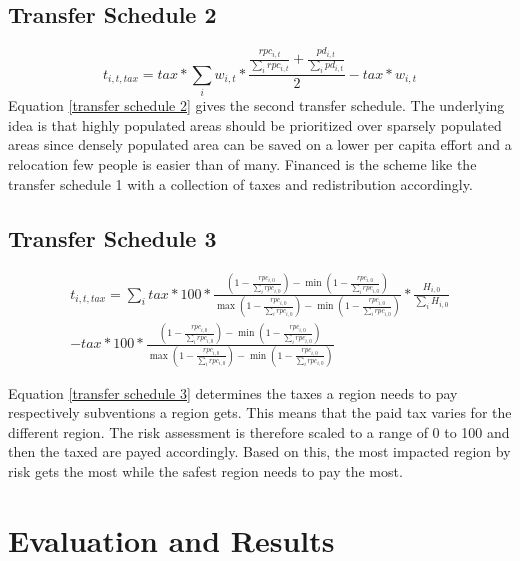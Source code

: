 \documentclass[10pt,a4paper]{article}
\begin{document}
\subsection{Transfer Schedule 2}

\begin{equation}
    t_{i,t,tax} = tax * \sum_i w_{i,t} * \frac{\frac{rpc_{i,t}}{\sum_i rpc_{i,t}} + \frac{pd_{i,t}}{\sum_i pd_{i,t}}}{2} - tax * w_{i,t}
    \label{transfer schedule 2}
\end{equation}
Equation \ref{transfer schedule 2} gives the second transfer schedule. The underlying idea is that highly populated areas should be prioritized over sparsely populated areas since densely populated area can be saved on a lower per capita effort and a relocation few people is easier than of many. Financed is the scheme like the transfer schedule 1 with a collection of taxes and redistribution accordingly. 

\subsection{Transfer Schedule 3}
\begin{multline}
    t_{i,t,tax} = \sum_{i}{tax * 100 * \frac{(1-\frac{rpc_{i,0}}{\sum_{i}rpc_{i,0}})-\min(1-\frac{rpc_{i,0}}{\sum_{i}rpc_{i,0}})}{\max(1-\frac{rpc_{i,0}}{\sum_{i}rpc_{i,0}})-\min(1-\frac{rpc_{i,0}}{\sum_{i}rpc_{i,0}})}}*\frac{H_{i,0}}{\sum_{i}H_{i,0}}\\-tax*100 * \frac{(1-\frac{rpc_{i,0}}{\sum_{i}rpc_{i,0}})-\min(1-\frac{rpc_{i,0}}{\sum_{i}rpc_{i,0}})}{\max(1-\frac{rpc_{i,0}}{\sum_{i}rpc_{i,0}})-\min(1-\frac{rpc_{i,0}}{\sum_{i}rpc_{i,0}})}
    \label{transfer schedule 3}
\end{multline}

Equation \ref{transfer schedule 3} determines the taxes a region needs to pay respectively subventions a region gets. This means that the paid tax varies for the different region. The risk assessment is therefore scaled to a range of 0 to 100 and then the taxed are payed accordingly. Based on this, the most impacted region by risk gets the most while the safest region needs to pay the most.
\newpage
\section{Evaluation and Results}
\end{document}
